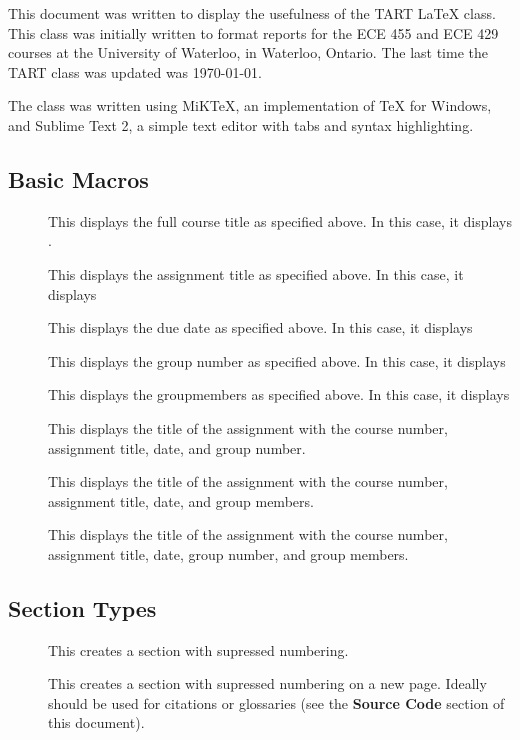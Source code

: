 \documentclass{technical_assignment_report}
\begin{document}
\fulltitle

\brief

This document was written to display the usefulness of the TART {\LaTeX} class. This class was initially written to format reports for the ECE 455 and ECE 429 courses at the University of Waterloo, in Waterloo, Ontario. The last time the TART class was updated was \today.

\environment

The class was written using MiKTeX, an implementation of {\TeX} for Windows, and Sublime Text 2, a simple text editor with tabs and syntax highlighting.


\subsection*{Basic Macros}
\begin{description}
\item[] This displays the full course title as specified above. In this case, it displays {\course}.
\item[] This displays the assignment title as specified above. In this case, it displays {\it\assignment}
\item[] This displays the due date as specified above. In this case, it displays {\duedate}
\item[] This displays the group number as specified above. In this case, it displays {\group}
\item[] This displays the groupmembers as specified above. In this case, it displays {\it\groupmem}
\item[] This displays the title of the assignment with the course number, assignment title, date, and group number.
\item[] This displays the title of the assignment with the course number, assignment title, date, and group members.
\item[] This displays the title of the assignment with the course number, assignment title, date, group number, and group members.
\end{description}

\subsection*{Section Types}
\begin{description}
\item[] This creates a section with supressed numbering.
\item[] This creates a section with supressed numbering on a new page. Ideally should be used for citations or glossaries (see the {\bf Source Code} section of this document).
\end{description}
\end{document}
